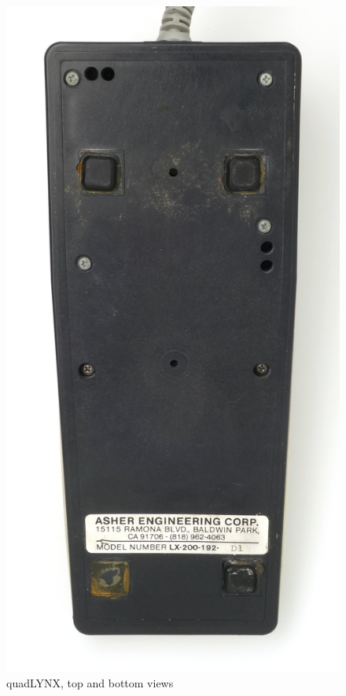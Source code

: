 \documentclass[11pt, a4paper]{article}
\begin{document}
\begin{figure}[h]
    \includegraphics[scale=0.45]{1986_honeywell_asher_quadlynx_trackball/bottom_30.jpg}
    \caption{quadLYNX, top and bottom views}
    \label{fig:quadLYNXTopBottom}
\end{figure}
\end{document}
